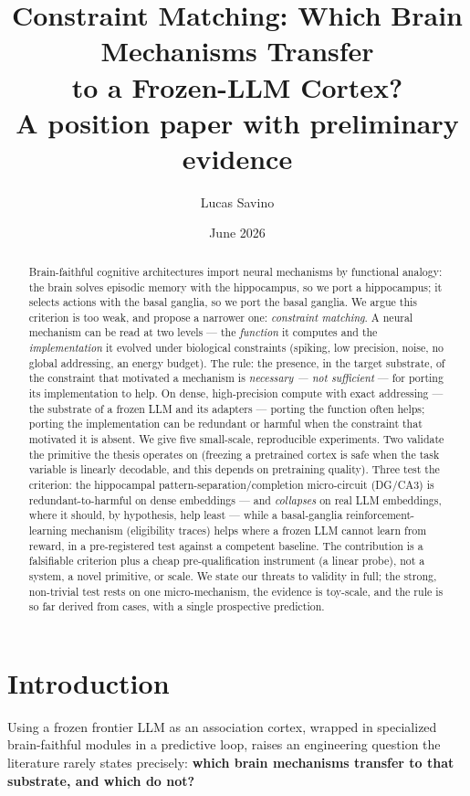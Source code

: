 \documentclass[11pt]{article}
\title{\textbf{Constraint Matching: Which Brain Mechanisms Transfer\\ to a Frozen-LLM Cortex?}\\[0.4em]
\large A position paper with preliminary evidence}
\author{Lucas Savino}
\date{June 2026}
\begin{document}
\maketitle

\begin{abstract}
Brain-faithful cognitive architectures import neural mechanisms by functional analogy: the brain solves episodic memory with the hippocampus, so we port a hippocampus; it selects actions with the basal ganglia, so we port the basal ganglia. We argue this criterion is too weak, and propose a narrower one: \emph{constraint matching}. A neural mechanism can be read at two levels --- the \emph{function} it computes and the \emph{implementation} it evolved under biological constraints (spiking, low precision, noise, no global addressing, an energy budget). The rule: the presence, in the target substrate, of the constraint that motivated a mechanism is \emph{necessary --- not sufficient} --- for porting its implementation to help. On dense, high-precision compute with exact addressing --- the substrate of a frozen LLM and its adapters --- porting the function often helps; porting the implementation can be redundant or harmful when the constraint that motivated it is absent. We give five small-scale, reproducible experiments. Two validate the primitive the thesis operates on (freezing a pretrained cortex is safe when the task variable is linearly decodable, and this depends on pretraining quality). Three test the criterion: the hippocampal pattern-separation/completion micro-circuit (DG/CA3) is redundant-to-harmful on dense embeddings --- and \emph{collapses} on real LLM embeddings, where it should, by hypothesis, help least --- while a basal-ganglia reinforcement-learning mechanism (eligibility traces) helps where a frozen LLM cannot learn from reward, in a pre-registered test against a competent baseline. The contribution is a falsifiable criterion plus a cheap pre-qualification instrument (a linear probe), not a system, a novel primitive, or scale. We state our threats to validity in full; the strong, non-trivial test rests on one micro-mechanism, the evidence is toy-scale, and the rule is so far derived from cases, with a single prospective prediction.
\end{abstract}

\section{Introduction}
Using a frozen frontier LLM as an association cortex, wrapped in specialized brain-faithful modules in a predictive loop, raises an engineering question the literature rarely states precisely: \textbf{which brain mechanisms transfer to that substrate, and which do not?}
\end{document}
